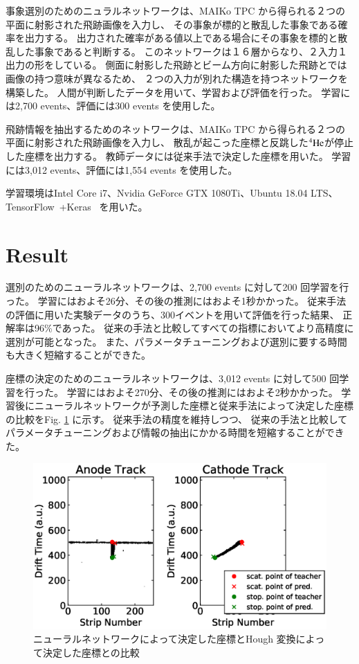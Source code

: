 \documentclass{jps-cp}
\begin{document}
事象選別のためのニュラルネットワークは、MAIKo TPC から得られる２つの平面に射影された飛跡画像を入力し、
その事象が標的と散乱した事象である確率を出力する。
出力された確率がある値以上である場合にその事象を標的と散乱した事象であると判断する。
このネットワークは１６層からなり、２入力１出力の形をしている。
側面に射影した飛跡とビーム方向に射影した飛跡とでは画像の持つ意味が異なるため、
２つの入力が別れた構造を持つネットワークを構築した。
人間が判断したデータを用いて、学習および評価を行った。
学習には2,700 events、評価には300 events を使用した。

飛跡情報を抽出するためのネットワークは、MAIKo TPC から得られる２つの平面に射影された飛跡画像を入力し、
散乱が起こった座標と反跳した${}^{4}\rm{He}$が停止した座標を出力する。
教師データには従来手法で決定した座標を用いた。
学習には3,012 events、評価には1,554 events を使用した。

学習環境はIntel Core i7、Nvidia GeForce GTX 1080Ti、Ubuntu 18.04 LTS、
TensorFlow~\cite{tensorflow}+Keras~\cite{keras} を用いた。

\section{Result}
選別のためのニューラルネットワークは、2,700 events に対して200 回学習を行った。
学習にはおよそ26分、その後の推測にはおよそ1秒かかった。
従来手法の評価に用いた実験データのうち、300イベントを用いて評価を行った結果、
正解率は96\%であった。
従来の手法と比較してすべての指標においてより高精度に選別が可能となった。
また、パラメータチューニングおよび選別に要する時間も大きく短縮することができた。

座標の決定のためのニューラルネットワークは、3,012 events に対して500 回学習を行った。
学習にはおよそ270分、その後の推測にはおよそ2秒かかった。
学習後にニューラルネットワークが予測した座標と従来手法によって決定した座標の比較をFig. \ref{fig:result_detection} に示す。
従来手法の精度を維持しつつ、
従来の手法と比較してパラメータチューニングおよび情報の抽出にかかる時間を短縮することができた。

\begin{figure}
  \centering
  \includegraphics[clip,width=0.9\columnwidth]{eps/point_detection_compair.eps}
  \caption{ニューラルネットワークによって決定した座標とHough 変換によって決定した座標との比較}
  \label{fig:result_detection}
\end{figure}
\end{document}
